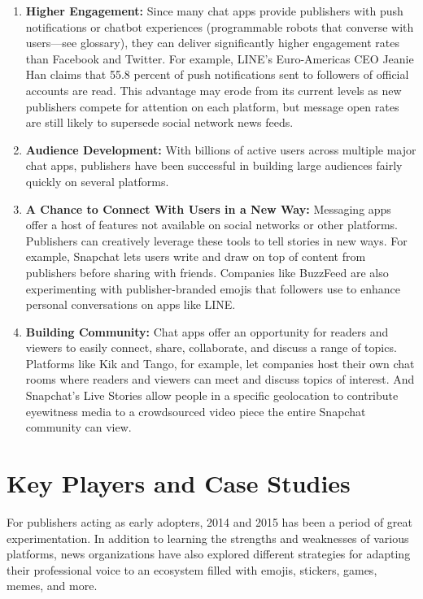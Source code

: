 \documentclass[notoc, symmetric, nobib, nols]{towcenter-guideto-book}
\newcommand{\blankpage}{\newpage\hbox{}\thispagestyle{empty}\newpage}
\begin{document}
\begin{enumerate}[itemsep=1em]
\item\textbf{Higher Engagement:} Since many chat apps provide publishers with push notifications or chatbot experiences (programmable robots that converse with users---see glossary), they can deliver significantly higher engagement rates than Facebook and Twitter. For example, LINE's Euro-Americas CEO Jeanie Han claims that 55.8 percent of push notifications sent to followers of official accounts are read.\autocite{BILINE} This advantage may erode from its current levels as new publishers compete for attention on each platform, but message open rates are still likely to supersede social network news feeds. 

\item\textbf{Audience Development:} With billions of active users across multiple major chat apps, publishers have been successful in building large audiences fairly quickly on several platforms.  

\item\textbf{A Chance to Connect With Users in a New Way:} Messaging apps offer a host of features not available on social networks or other platforms. Publishers can creatively leverage these tools to tell stories in new ways. For example, Snapchat lets users write and draw on top of content from publishers before sharing with friends. Companies like BuzzFeed are also experimenting with publisher-branded emojis that followers use to enhance personal conversations on apps like LINE.  

\item\textbf{Building Community:} Chat apps offer an opportunity for readers and viewers to easily connect, share, collaborate, and discuss a range of topics. Platforms like Kik and Tango, for example, let companies host their own chat rooms where readers and viewers can meet and discuss topics of interest. And Snapchat's Live Stories allow people in a specific geolocation to contribute eyewitness media to a crowdsourced video piece the entire Snapchat community can view.
\end{enumerate}
  
\chapter{Key Players and Case Studies}
\blankpage
\noindent For publishers acting as early adopters, 2014 and 2015 has been a period of great experimentation. In addition to learning the strengths and weaknesses of various platforms, news organizations have also explored different strategies for adapting their professional voice to an ecosystem filled with emojis, stickers, games, memes, and more.   
\end{document}
